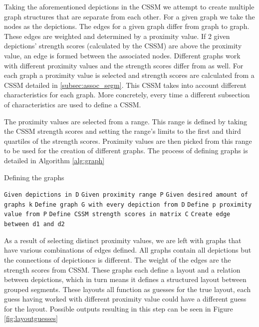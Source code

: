 Taking the aforementioned depictions in the CSSM we attempt to create multiple graph structures that are separate from each other. For a given graph we take the nodes as the depictions. The edges for a given graph differ from graph to graph. These edges are weighted and  determined by a proximity value. If 2 given depictions' strength scores (calculated by the CSSM) are above the proximity value, an edge is formed between the associated nodes. Different graphs work with different proximity values and the strength scores differ from as well. For each graph a proximity value is selected and strength scores are calculated from a CSSM detailed in \ref{subsec:assoc_segm}. This CSSM takes into account different characteristics for each graph. More concretely, every time a different subsection of characteristics are used to define a CSSM. 

The proximity values are selected from a range. This range is defined by taking the CSSM strength scores and setting the range's limits to the first and third quartiles of the strength scores. Proximity values are then picked from this range to be used for the creation of different graphs. The process of defining graphs is detailed in Algorithm \ref{alg:graph}

\begin{algorithm}
\caption{Defining the graphs}\label{alg:graph}
\begin{algorithmic}
\State \texttt{Given depictions in D}
\State \texttt{Given proximity range P}
\State \texttt{Given desired amount of graphs k}
\State \texttt{Define graph G with every depiction from D}
    \State \texttt{Define p proximity value from P}
    \State \texttt{Define CSSM strength scores in matrix C}
                \State \texttt{Create edge between d1 and d2}
            \EndIf
        \EndFor
    \EndFor
\EndFor

\end{algorithmic}
\end{algorithm}


\newpage
As a result of selecting distinct proximity values, we are left with graphs that have various combinations of edges defined. All graphs contain all depictions but the connections of depictioncs is different. The weight of the edges are the strength scores from CSSM. These graphs each define a layout and a relation between depictions, which in turn means it defines a structured layout between grouped segments. These layouts all function as guesses for the true layout, each guess having worked with different proximity value could have a different guess for the layout. Possible outputs resulting in this step can be seen in Figure \ref{fig:layoutguesses}

